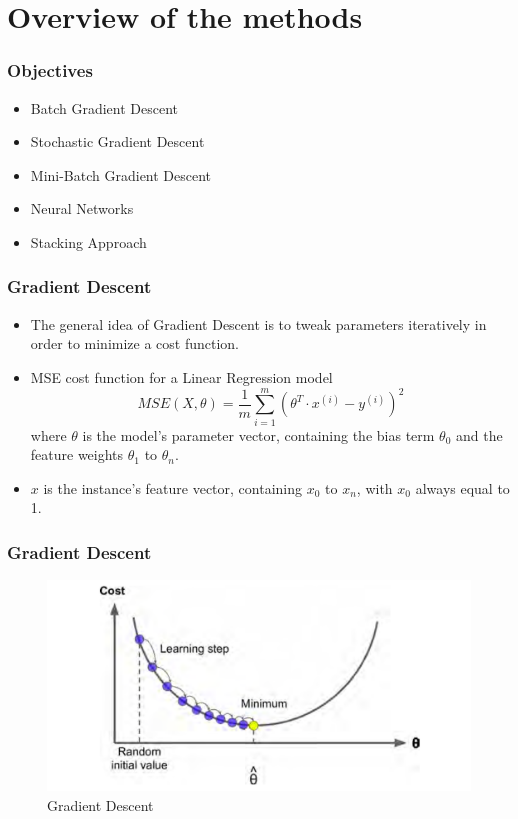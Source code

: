 \documentclass[11pt]{beamer}
\begin{document}
\section{Overview of the methods}

\begin{frame}
  \frametitle{Objectives}
\begin{itemize}
	\item Batch Gradient Descent
	\item Stochastic Gradient Descent
	\item Mini-Batch Gradient Descent
\pause	
	 \item Neural Networks
	 \pause
	  \item Stacking Approach
	 
\end{itemize}
\end{frame}

\begin{frame}
	\frametitle{Gradient Descent}
	\begin{itemize}
		\item The general idea of Gradient Descent is to tweak parameters iteratively in order to minimize a cost function.
		\pause
		\item MSE cost function for a Linear Regression model
		 $$ MSE(X,\theta)=\frac{1}{m}\sum_{i=1}^m \left(\theta^T \cdot x^{(i)}-y^{(i)}\right)^2$$
		where  $\theta$ is the model’s parameter vector, containing the bias term $\theta_0$ and the feature
		weights $\theta_1$ to $\theta_n$.
		\item $x$ is the instance’s feature vector, containing $x_0$ to $x_n$, with $x_0$ always equal to 1. 
	\end{itemize}
\end{frame}

\begin{frame}
	\frametitle{Gradient Descent}
	\begin{figure}
		\centering
		\includegraphics[scale=0.35]{figure4-3}
		\caption{Gradient Descent}
	\end{figure}		
	\end{frame}
\end{document}

